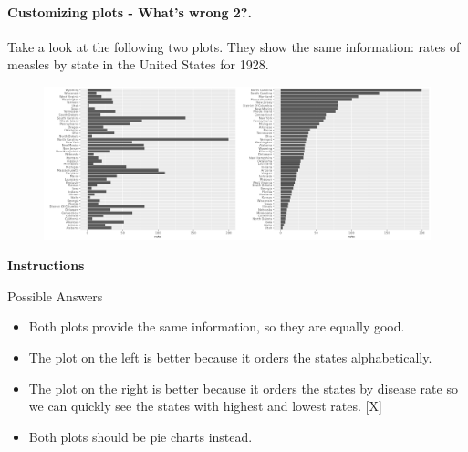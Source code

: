 \documentclass[]{article}
\providecommand{\tightlist}{%
  \setlength{\itemsep}{0pt}\setlength{\parskip}{0pt}}
\let\oldparagraph\paragraph
\renewcommand{\paragraph}[1]{\oldparagraph{#1}\mbox{}}
\begin{document}
\paragraph{\texorpdfstring{\textbf{Customizing plots - What's wrong
2?.}}{Customizing plots - What's wrong 2?.}}\label{customizing-plots---whats-wrong-2.}

Take a look at the following two plots. They show the same information:
rates of measles by state in the United States for 1928.

\begin{figure}
\centering
\includegraphics{ex-3.png}
\caption{}
\end{figure}

\textbf{Instructions}

Possible Answers

\begin{itemize}
\tightlist
\item
  Both plots provide the same information, so they are equally good.
\item
  The plot on the left is better because it orders the states
  alphabetically.
\item
  The plot on the right is better because it orders the states by
  disease rate so we can quickly see the states with highest and lowest
  rates. {[}X{]}
\item
  Both plots should be pie charts instead.
\end{itemize}
\end{document}
